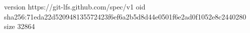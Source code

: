 version https://git-lfs.github.com/spec/v1
oid sha256:71eda22d520948135572423f6ef6a2b5d8d44e0501f6e2ad0f1052e8c2440280
size 32864
